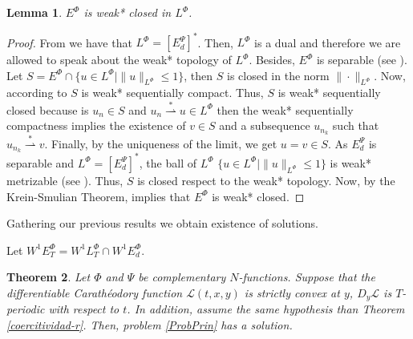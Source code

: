 \documentclass[twoside]{article}
\newtheorem{thm}{Theorem}[section]
\newtheorem{lem}[thm]{Lemma}
\theoremstyle{remark}
\newcommand{\orlnor}{\|_{L^{\Phi}}}
\newcommand{\lphi}{L^{\Phi}}
\newcommand{\ephi}{E^{\Phi}}
\newcommand{\wphi}{W^{1}\lphi}
\newcommand{\wphiet}{W^{1}\ephi_T}
\newcommand{\wphie}{W^{1}\ephi}
\renewcommand{\leq}{\leqslant}
\newcommand{\epsi}{E^{\Psi}}
\begin{document}
\begin{lem}\label{lem:deb*cerrado}
$\ephi$ is weak* closed in $\lphi$.
\end{lem}


\begin{proof}
From \cite[Thm. 7, p. 110]{rao1991theory} we have that $\lphi=\left[\epsi_d\right]^*
$.
Then, $\lphi$ is a dual and therefore we are allowed to speak about the weak* topology of $\lphi$.
Besides, $\ephi
$ is separable (see \cite[Thm. 1, p. 87]{rao1991theory}).
Let $S=\ephi\cap \{u \in \lphi|\|u\orlnor\leq 1\}$, then $S$ is closed in the norm $\|\cdot\orlnor$. Now, according to \cite[Cor. 5, p. 148]{rao1991theory} $S$ is weak* sequentially compact. Thus, $S$ is weak* sequentially closed because
is $u_n\in S$ and
$u_n \overset{*}{\rightharpoonup}u \in \lphi$ then  the weak* sequentially compactness implies the existence of $v \in S$ and a subsequence $u_{n_k}$ such that 
$u_{n_k}\overset{*}{\rightharpoonup}v$. Finally, by the uniqueness of   the limit, we get
$u=v\in S$.
As $\epsi_d$ is separable and $\lphi=\left[\epsi_d\right]^*$, the ball of $\lphi$ $\{u \in \lphi | \|u\orlnor\leq 1\}$ is  weak* metrizable (see \cite[Thm. 5.1, p. 138]{Conway1977}).
Thus, $S$ is closed respect to  the weak* topology. Now, by the Krein-Smulian Theorem, \cite[Cor. 12.6, p. 165]{Conway1977} implies that $\ephi$ is weak* closed.
\end{proof}

Gathering our previous results we obtain existence of solutions.

Let $\wphiet=\wphi_T \cap \wphie_d$.


\begin{thm} 
Let $\Phi$ and $\Psi$ be complementary $N$-functions. 
Suppose that the differentiable Carath\'eodory function $\mathcal{L}(t,x,y)$ is strictly convex at $y$, $D_{y}\mathcal{L}$ is $T$-periodic with respect to $t$. In addition, assume the same hypothesis than Theorem \ref{coercitividad-r}. Then, problem \eqref{ProbPrin} has a solution.
\end{thm}
\end{document}
